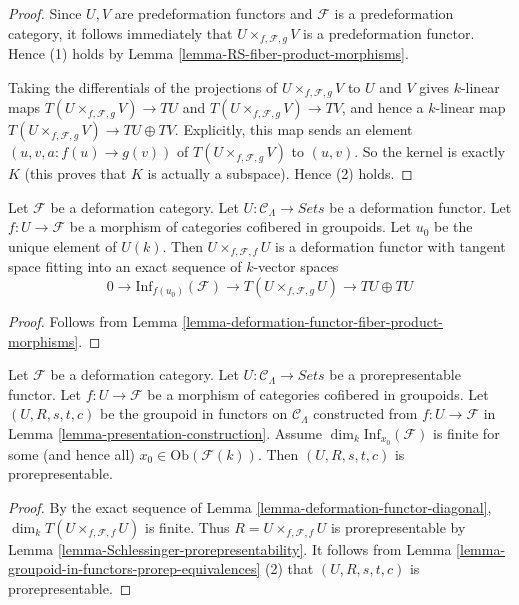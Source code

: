 \begin{proof}
Since $U,V$ are predeformation functors and $\mathcal{F}$ is a predeformation 
category, it follows immediately that $U \times_{f, \mathcal{F}, g} V$ is a 
predeformation functor.  Hence (1) holds by Lemma 
\ref{lemma-RS-fiber-product-morphisms}.

\medskip \noindent
Taking the differentials of the projections of $U \times_{f, \mathcal{F}, g} V$ 
to $U$ and $V$ gives $k$-linear maps $T(U \times_{f, \mathcal{F}, g} V) 
\to TU$ and $T(U \times_{f, \mathcal{F}, g} V) \to TV$, and 
hence a $k$-linear map $T(U \times_{f, \mathcal{F}, g} V) \to TU \oplus 
TV$.  Explicitly, this map sends an element $(u,v,a: f(u) \to g(v))$ of 
$T(U \times_{f, \mathcal{F}, g} V)$ to $(u,v)$.  So the kernel is exactly $K$ 
(this proves that $K$ is actually a subspace). Hence (2) holds.
\end{proof}

\begin{lemma}
\label{lemma-deformation-functor-diagonal}
Let $\mathcal{F}$ be a deformation category.  Let $U: \mathcal{C}_\Lambda 
\to \textit{Sets}$ be a deformation functor.  Let $f: U 
\to \mathcal{F}$ be a morphism of categories cofibered in groupoids. Let 
$u_0$ be the unique element of $U(k)$.  Then $U \times_{f,\mathcal{F},f} U$ is a 
deformation functor with tangent space fitting into an exact sequence of 
$k$-vector spaces
\[ 
0 \to \text{Inf}_{f(u_0)}(\mathcal{F}) \to T(U \times_{f, 
\mathcal{F}, g} U) \to TU \oplus TU 
\]
\end{lemma}

\begin{proof}
Follows from Lemma \ref{lemma-deformation-functor-fiber-product-morphisms}.
\end{proof}

\begin{lemma}
\label{lemma-prorepresentable-groupoid-in-functors-construction}
Let $\mathcal{F}$ be a deformation category.  Let $U: \mathcal{C}_\Lambda 
\to \textit{Sets}$ be a prorepresentable functor.  Let $f: U 
\to \mathcal{F}$ be a morphism of categories cofibered in groupoids.  
Let $(U,R,s,t,c)$ be the groupoid in functors on $\mathcal{C}_\Lambda$ 
constructed from $f: U \to \mathcal{F}$ in Lemma 
\ref{lemma-presentation-construction}. Assume $\dim_{k} 
\text{Inf}_{x_0}(\mathcal{F})$ is finite for some (and hence all) $x_0 \in 
\text{Ob}(\mathcal{F}(k))$.  Then  $(U,R,s,t,c)$ is prorepresentable.
\end{lemma}

\begin{proof}
By the exact sequence of Lemma \ref{lemma-deformation-functor-diagonal}, 
$\dim_{k} T(U \times_{f,\mathcal{F},f} U)$ is finite.  Thus $R =U 
\times_{f,\mathcal{F},f} U$ is prorepresentable by Lemma 
\ref{lemma-Schlessinger-prorepresentability}. It follows from Lemma 
\ref{lemma-groupoid-in-functors-prorep-equivalences} (2) that $(U,R,s,t,c)$ is 
prorepresentable.
\end{proof}

